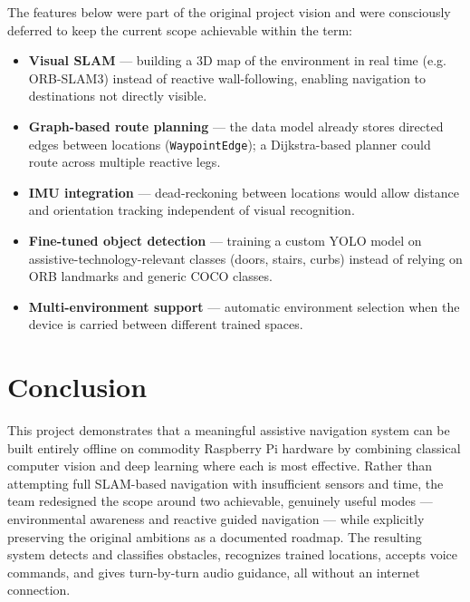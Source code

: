 \documentclass[12pt,a4paper]{article}
\begin{document}
The features below were part of the original project vision and were consciously deferred to keep the current scope achievable within the term:

\begin{itemize}[leftmargin=1.4cm]
  \item \textbf{Visual SLAM} — building a 3D map of the environment in real time (e.g. ORB-SLAM3) instead of reactive wall-following, enabling navigation to destinations not directly visible.
  \item \textbf{Graph-based route planning} — the data model already stores directed edges between locations (\texttt{WaypointEdge}); a Dijkstra-based planner could route across multiple reactive legs.
  \item \textbf{IMU integration} — dead-reckoning between locations would allow distance and orientation tracking independent of visual recognition.
  \item \textbf{Fine-tuned object detection} — training a custom YOLO model on assistive-technology-relevant classes (doors, stairs, curbs) instead of relying on ORB landmarks and generic COCO classes.
  \item \textbf{Multi-environment support} — automatic environment selection when the device is carried between different trained spaces.
\end{itemize}

\section{Conclusion}

This project demonstrates that a meaningful assistive navigation system can be built entirely offline on commodity Raspberry Pi hardware by combining classical computer vision and deep learning where each is most effective. Rather than attempting full SLAM-based navigation with insufficient sensors and time, the team redesigned the scope around two achievable, genuinely useful modes — environmental awareness and reactive guided navigation — while explicitly preserving the original ambitions as a documented roadmap. The resulting system detects and classifies obstacles, recognizes trained locations, accepts voice commands, and gives turn-by-turn audio guidance, all without an internet connection.
\end{document}
